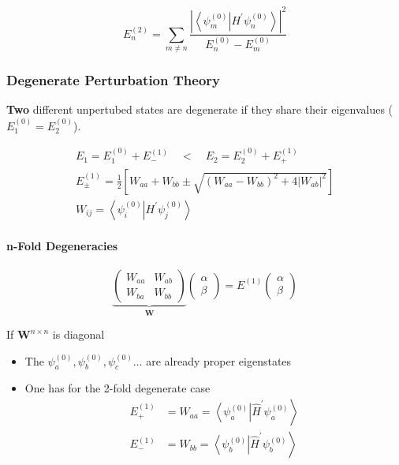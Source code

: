\begin{equation*}
    E_{n}^{(2)}=\sum_{m\neq n}\frac{\left|\left\langle\psi_{m}^{(0)}\right|H^{\prime}\left.\psi_{n}^{(0)}\right\rangle\right|^{2}}{E_{n}^{(0)}-E_{m}^{(0)}}
\end{equation*}

\subsubsection{Degenerate Perturbation Theory}
\textbf{Two} different unpertubed states are degenerate if they share their eigenvalues ($E_1^{(0)} = E_2^{(0)}$).

\newpar{}
\noindent\begin{gather*}
    E_1 = E_1^{(0)} + E_{-}^{(1)} \quad < \quad E_2 = E_2^{(0)} + E_{+}^{(1)}\\
    E_{\pm}^{(1)}=\frac{1}{2}\left[W_{aa}+W_{bb}\pm\sqrt{{(W_{aa}-W_{bb})}^{2}+4 |W_{ab}|^{2}}\right]\\
    W_{ij}=\left\langle\psi_{i}^{(0)} \right| H^{\prime} \left.\psi_{j}^{(0)}\right\rangle
\end{gather*}

\paragraph{n-Fold Degeneracies}
\noindent\begin{equation*}
    \underbrace{
        \left(\begin{array}{cc}
            W_{aa} & W_{ab} \\
            W_{ba} & W_{bb}
        \end{array}\right)}_{\mathbf{W}}
    \left(\begin{array}{c}
            \alpha \\
            \beta
        \end{array}\right)
    =E^{(1)}\left(\begin{array}{c}
            \alpha \\
            \beta
        \end{array}\right)
\end{equation*}

If $\mathbf{W}^{n\times n}$ is diagonal
\begin{itemize}
    \item The $\psi_a^{(0)},\psi_b^{(0)},\psi_c^{(0)} \dots $ are already proper eigenstates
    \item One has for the 2-fold degenerate case
          \begin{align*}
              E_{+}^{(1)} & =W_{aa}=\left\langle\psi_{a}^{(0)}\right|\left.\widehat{H}^{\prime}\psi_{a}^{(0)}\right\rangle \\
              E_{-}^{(1)} & =W_{bb}=\left\langle\psi_{b}^{(0)}\right|\left.\widehat{H}^{\prime}\psi_{b}^{(0)}\right\rangle
          \end{align*}
\end{itemize}

